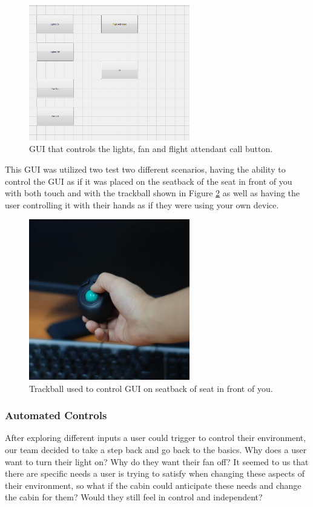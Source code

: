 \begin{figure}[h]
  \centering
     \includegraphics[width=7cm]{images/MATLABGUI.jpg}
   \caption{ GUI that controls the lights, fan and flight attendant call button. }
  \label{fig:MATLABGUI.jpg}
\end{figure}

This GUI was utilized two test two different scenarios, having the ability to control the GUI as if it was placed on the seatback of the seat in front of you with both touch and with the trackball shown in Figure \ref{fig:Trackball.jpg} as well as having the user controlling it with their hands as if they were using your own device. 

\begin{figure}[h]
  \centering
     \includegraphics[width=7cm]{images/Trackball.jpg}
   \caption{ Trackball used to control GUI on seatback of seat in front of you. }
  \label{fig:Trackball.jpg}
\end{figure}


\subsubsection*{Automated Controls}

After exploring different inputs a user could trigger to control their environment, our team decided to take a step back and go back to the basics. Why does a user want to turn their light on? Why do they want their fan off? It seemed to us that there are specific needs a user is trying to satisfy when changing these aspects of their environment, so what if the cabin could anticipate these needs and change the cabin for them? Would they still feel in control and independent? 

